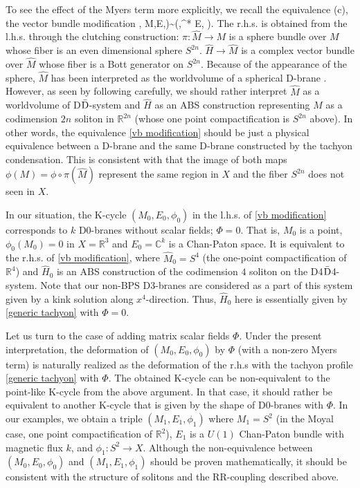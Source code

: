 \documentclass[12pt]{article}
\numberwithin{equation}{section}
\def\real{\mathbb{R}}
\def\complex{\mathbb{C}}
\def\bea#1\ena{\begin{align}#1\end{align}}
\begin{document}
To see %
the effect of the Myers term {more explicitly}, 
we recall %
the equivalence (c), the vector bundle modification {\cite{Douglas1982}}, 
\bea
(M,E,\phi)\sim (,\otimes \pi^* E, \phi \circ \pi).
\label{vb modification}
\ena
The r.h.s. is obtained from the l.h.s. through the clutching construction:
$\pi: \hat{M}\to M$ is a sphere bundle over $M$ 
whose fiber is an even dimensional sphere $S^{2n}$.
$\hat{H}\to \hat{M}$ is a complex vector bundle over $\hat{M}$ 
whose fiber is a Bott generator on $S^{2n}$.
Because of the appearance of the sphere, $\hat{M}$ has been interpreted as 
the worldvolume of a spherical D-brane \cite{Asakawa2002,SZABO2002,Reis2006}.
However, as seen by following {\cite{Douglas1982}} carefully, 
we should rather interpret 
$\hat{M}$ as a worldvolume of D$\bar{\rm D}$-system and 
$\hat{H}$ as an ABS construction representing $M$ as a codimension $2n$ soliton in 
$\real^{2n}$ (whose one point compactification is $S^{2n}$ above).
In other words, the equivalence \eqref{vb modification} should be
just a physical equivalence between a D-brane and 
the same D-brane constructed by the tachyon condensation.
This is consistent with that the image of both maps 
$\phi(M)=\phi \circ \pi(\hat{M})$ represent 
the same region in $X$ and the fiber $S^{2n}$ does not seen in $X$.

In our situation, the K-cycle $(M_0,E_0,\phi_0)$ in the l.h.s. of \eqref{vb modification}
corresponds to $k$ D0-branes without scalar fields; $\Phi=0$. 
That is, $M_0$ is a point, $\phi_0(M_0)=0$ in $X=\real^3$ and $E_0=\complex^k$
is a Chan-Paton space.
It is equivalent to the r.h.s. of \eqref{vb modification},
where $\hat{M}_0=S^4$ (the one-point compactification of $\real^4$) 
and $\hat{H}_0$ is an ABS construction 
of the codimension $4$ soliton on the D4$\bar{\rm D}$4-system.
Note that our non-BPS D3-branes are considered as a part of this system 
given by a kink solution along $x^4$-direction.
Thus, $\hat{H}_0$ here is essentially given by \eqref{generic tachyon} with $\Phi=0$.

Let us turn to the case of adding matrix scalar fields $\Phi$.
Under the present interpretation, 
the deformation of $(M_0,E_0,\phi_0)$ by $\Phi$ (with a non-zero Myers term) is naturally %
realized as the deformation of the r.h.s with the tachyon profile 
\eqref{generic tachyon} with $\Phi$.
The obtained K-cycle can be non-equivalent to the point-like K-cycle from the above argument. %
In that case, it should rather be equivalent to another K-cycle that is given by the shape of D0-branes with $\Phi$. 
In our examples, we obtain a triple $(M_1,E_1,\phi_1)$
where $M_1=S^2$ (in the Moyal case, one point compactification of $\real^2$), 
$E_1$ is a $U(1)$ Chan-Paton bundle with magnetic flux $k$, and $\phi_1:S^2\to X$.
Although the non-equivalence between $(M_0,E_0,\phi_0)$ and $(M_1,E_1,\phi_1)$ should
be proven mathematically, 
it should be consistent with the structure of solitons and the RR-coupling described above.
\end{document}
